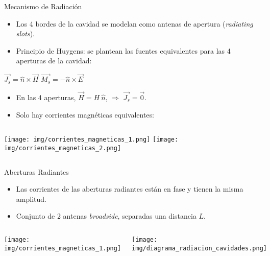 \begin{frame}{Mecanismo de Radiación}

\begin{itemize}
    \item<1-> Los 4 bordes de la cavidad se modelan como antenas de apertura (\textit{radiating slots}).
    \item<2-> Principio de Huygens: se plantean las fuentes equivalentes para las 4 aperturas de la cavidad:
\end{itemize}

\begin{center}
    $\overrightarrow{J_s} = \hat{n} \times \overrightarrow{H}$ \hspace{1cm} $\overrightarrow{M_s} = -\hat{n} \times \overrightarrow{E}$
\end{center}

\begin{itemize}
    \item<4-> En las 4 aperturas, $\overrightarrow{H} = H \ \hat{n}$, $\Rightarrow$ $\overrightarrow{J_s} = \overrightarrow{0}$.
    \item<5-> Solo hay corrientes magnéticas equivalentes:
\end{itemize}

\begin{columns}
        \texttt{[image: img/corrientes\_magneticas\_1.png]}
        \texttt{[image: img/corrientes\_magneticas\_2.png]}
\end{columns}
\end{frame}

\begin{frame}{Aberturas Radiantes}
    \begin{itemize}
        \item<1-> Las corrientes de las aberturas radiantes están en fase y tienen la misma amplitud.
        \item<2-> Conjunto de 2 antenas \textit{broadside}, separadas una distancia $L$.
    \end{itemize}

    \begin{columns}
            \begin{center}
                \texttt{[image: img/corrientes\_magneticas\_1.png]}
            \end{center}
            \begin{center}
                \texttt{[image: img/diagrama\_radiacion\_cavidades.png]}
            \end{center}
    \end{columns}
\end{frame}

